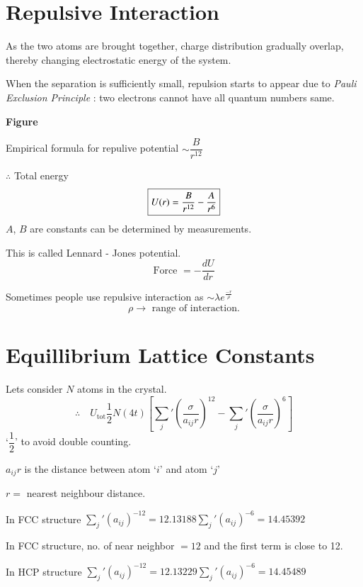 \section*{Repulsive Interaction}

As the two atoms are brought together, charge distribution gradually overlap, thereby changing electrostatic energy of the system.

When the separation is sufficiently small, repulsion starts to appear due to {\em Pauli Exclusion Principle} : two electrons cannot have all quantum numbers same.
\begin{center}
{\bf Figure}
\end{center}

Empirical formula for repulive potential $\sim \dfrac{B}{r^{12}}$

$\therefore$ Total energy
$$
\fbox{$U(r)=\dfrac{B}{r^{12}}-\dfrac{A}{r^{6}}$}
$$
$A$, $B$ are constants can be determined by measurements.

This is called Lennard - Jones potential.
$$
\text{Force } = -\dfrac{dU}{dr}
$$

Sometimes people use repulsive interaction as $\sim \lambda e^{\frac{-r}{\rho}}$
$$
\rho \to \text{ range of interaction.}
$$

\section*{Equillibrium Lattice Constants}

Lets consider $N$ atoms in the crystal.
$$
\therefore\quad U_{\text{tot}}\frac{1}{2}N(4t)\left[{\sum\limits_{j}}'\left(\dfrac{\sigma}{a_{ij}r}\right)^{12}-{\sum\limits_{j}}'\left(\dfrac{\sigma}{a_{ij}r}\right)^{6}\right]
$$
`$\dfrac{1}{2}$' to avoid double counting.

$a_{ij}r$ is the distance between atom `$i$' and atom `$j$'

$r=$ nearest neighbour distance.

In FCC structure ${\sum\limits_{j}}'(a_{ij})^{-12}=12.13188$\quad ${\sum\limits_{j}}'(a_{ij})^{-6}=14.45392$

In FCC structure, no. of near neighbor $=12$ and the first term is close to 12.

In HCP structure ${\sum\limits_{j}}'(a_{ij})^{-12}=12.13229$\quad ${\sum\limits_{j}}'(a_{ij})^{-6}=14.45489$

